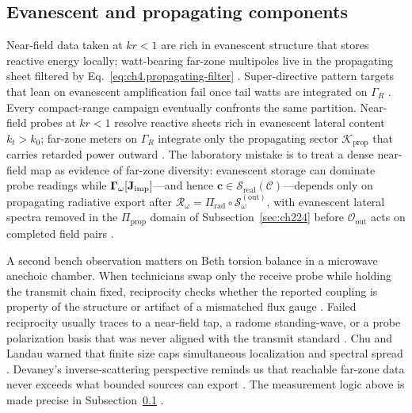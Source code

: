 \subsection{Evanescent and propagating components}
\label{sec:ch442}
Near-field data taken at $kr<1$ are rich in evanescent structure that stores reactive energy locally; watt-bearing far-zone multipoles live in the propagating sheet filtered by Eq.~\eqref{eq:ch4.propagating-filter} \cite{stratton1941}. Super-directive pattern targets that lean on evanescent amplification fail once tail watts are integrated on $\Gamma_R$ \cite{hansen1988}.
Every compact-range campaign eventually confronts the same partition. Near-field probes at $kr<1$ resolve reactive sheets rich in evanescent lateral content $k_t>k_0$; far-zone meters on $\Gamma_R$ integrate only the propagating sector $\mathcal{K}_{\mathrm{prop}}$ that carries retarded power outward \cite{stratton1941}. The laboratory mistake is to treat a dense near-field map as evidence of far-zone diversity: evanescent storage can dominate probe readings while $\boldsymbol{\Gamma}_\omega[\mathbf{J}_{\mathrm{imp}}]$---and hence $\mathbf{c}\in\mathcal{S}_{\mathrm{real}}(\mathcal{C})$---depends only on propagating radiative export after
$\mathcal{R}_\omega=\Pi_{\mathrm{rad}}\circ\mathcal{S}_\omega^{(\mathrm{out})}$, with evanescent lateral spectra removed in the $\Pi_{\mathrm{prop}}$ domain of Subsection~\ref{sec:ch224} before $\mathcal{O}_{\mathrm{out}}$ acts on completed field pairs \cite{harrington2001}.
\begin{physicalvignette}
A second bench observation matters on Beth torsion balance in a microwave anechoic chamber. When technicians swap only the receive probe while holding the transmit chain fixed, reciprocity checks whether the reported coupling is property of the structure or artifact of a mismatched flux gauge \cite{stratton1941}. Failed reciprocity usually traces to a near-field tap, a radome standing-wave, or a probe polarization basis that was never aligned with the transmit standard \cite{hansen1988}.
Chu and Landau warned that finite size caps simultaneous localization and spectral spread \cite{chu1948}. Devaney's inverse-scattering perspective reminds us that reachable far-zone data never exceeds what bounded sources can export \cite{devaney2004}.
The measurement logic above is made precise in Subsection~\ref{sec:ch442} \cite{stratton1941}.
\end{physicalvignette}
